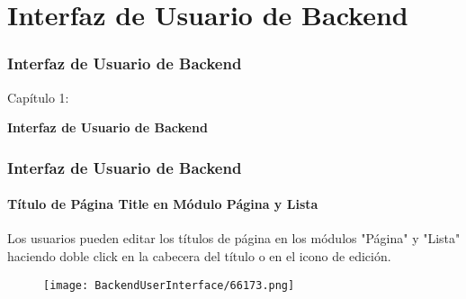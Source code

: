 %

\section{Interfaz de Usuario de Backend}
\begin{frame}[fragile]
	\frametitle{Interfaz de Usuario de Backend}

	\begin{center}\huge{Capítulo 1:}\end{center}
	\begin{center}\huge{\color{typo3darkgrey}\textbf{Interfaz de Usuario de Backend}}\end{center}

\end{frame}

\begin{frame}[fragile]
	\frametitle{Interfaz de Usuario de Backend}
	\framesubtitle{Título de Página Title en Módulo Página y Lista}

	Los usuarios pueden editar los títulos de página en los módulos "Página" y "Lista" haciendo doble click en la cabecera del
	título o en el icono de edición.

	\begin{figure}
		\texttt{[image: BackendUserInterface/66173.png]}
	\end{figure}

\end{frame}

